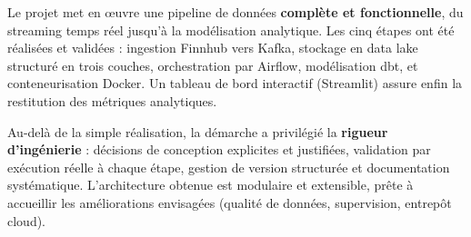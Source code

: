 \documentclass[11pt,a4paper]{article}
\begin{document}
Le projet met en œuvre une pipeline de données \textbf{complète et fonctionnelle},
du streaming temps réel jusqu'à la modélisation analytique. Les cinq étapes ont
été réalisées et validées : ingestion Finnhub vers Kafka, stockage en data lake
structuré en trois couches, orchestration par Airflow, modélisation dbt, et
conteneurisation Docker. Un tableau de bord interactif (Streamlit) assure enfin
la restitution des métriques analytiques.

Au-delà de la simple réalisation, la démarche a privilégié la \textbf{rigueur
d'ingénierie} : décisions de conception explicites et justifiées, validation par
exécution réelle à chaque étape, gestion de version structurée et documentation
systématique. L'architecture obtenue est modulaire et extensible, prête à
accueillir les améliorations envisagées (qualité de données, supervision,
entrepôt cloud).
\end{document}

